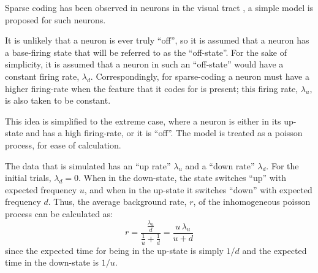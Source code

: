 Sparse coding has been observed in neurons in the visual tract \cite{OlshausenField2004}, a simple model is proposed for such neurons.

It is unlikely that a neuron is ever truly ``off'', so it is assumed that a neuron has a base-firing state that will be referred to as the ``off-state''.  For the sake of simplicity, it is assumed that a neuron in such an ``off-state'' would have a constant firing rate, $\lambda_d$.  Correspondingly, for sparse-coding a neuron must have a higher firing-rate when the feature that it codes for is present; this firing rate, $\lambda_u$, is also taken to be constant.


This idea is simplified to the extreme case, where a neuron is either in its up-state and has a high firing-rate, or it is ``off''.   The model is treated as a poisson process, for ease of calculation.


The data that is simulated has an ``up rate'' $\lambda_u$ and a ``down rate'' $\lambda_d$.  For the initial trials, $\lambda_d = 0$.  When in the down-state, the state switches ``up'' with expected frequency $u$, and when in the up-state it switches ``down'' with expected frequency $d$.  Thus, the average background rate, $r$, of the inhomogeneous poisson process can be calculated as:
\begin{equation}\label{lam}
r = \frac{ \frac{\lambda_u }{d}}{ \frac{1}{u} + \frac{1}{d}} = \frac{u\, \lambda_u}{u+d}
\end{equation}
since the expected time for being in the up-state is simply $1/d$ and the expected time in the down-state is $1/u$.

